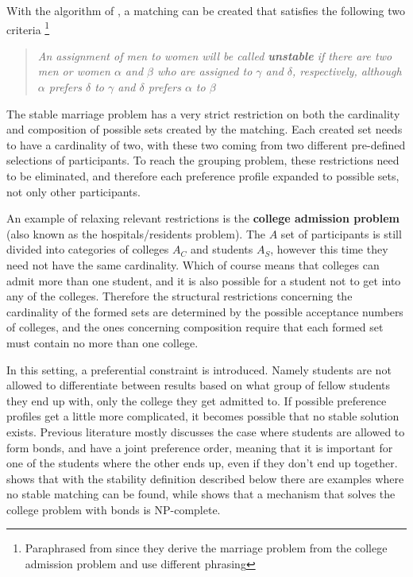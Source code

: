 \documentclass{elsarticle}
\begin{document}
With the algorithm of \cite{galeshapley62}, a matching can be created that satisfies the following two criteria \footnote{Paraphrased from \cite[p. 10]{galeshapley62} since they derive the marriage problem from the college admission problem and use different phrasing}

\begin{quotation} 
\textit{An assignment of men to women will be called \textbf{unstable} if there are two men or women $\alpha$ and $\beta$ who are assigned to $\gamma$ and $\delta$, respectively, although $\alpha$ prefers $\delta$ to $\gamma$ and $\delta$ prefers $\alpha$ to $\beta$} 
\end{quotation}

The stable marriage problem has a very strict restriction on both the cardinality and composition of possible sets created by the matching. Each created set needs to have a cardinality of two, with these two coming from two different pre-defined selections of participants. To reach the grouping problem, these restrictions need to be eliminated, and therefore each preference profile expanded to possible sets, not only other participants.

An example of relaxing relevant restrictions is the \textbf{college admission problem} (also known as the hospitals/residents problem). The $A$ set of participants is still divided into categories of colleges $A_C$ and students $A_S$, however this time they need not have the same cardinality. Which of course means that colleges can admit more than one student, and it is also possible for a student not to get into any of the colleges. Therefore the structural restrictions concerning the cardinality of the formed sets are determined by the possible acceptance numbers of colleges, and the ones concerning composition require that each formed set must contain no more than one college.

In this setting, a preferential constraint is introduced. Namely students are not allowed to differentiate between results based on what group of fellow students they end up with, only the college they get admitted to. If possible preference profiles get a little more complicated, it becomes possible that no stable solution exists. Previous literature mostly discusses the case where students are allowed to form bonds, and have a joint preference order, meaning that it is important for one of the students where the other ends up, even if they don't end up together. \cite{roth84} shows that with the stability definition described below there are examples where no stable matching can be found, while \cite{ronn90} shows that a mechanism that solves the college problem with bonds is NP-complete.
\end{document}
